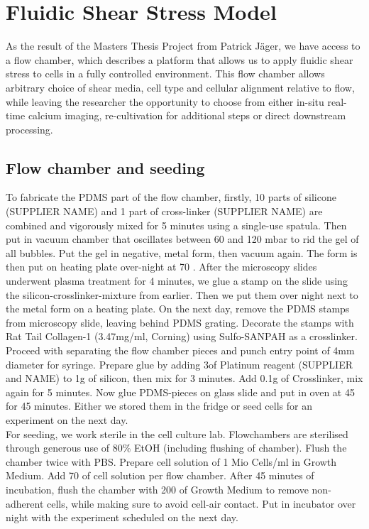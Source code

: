\section{Fluidic Shear Stress Model}
As the result of the Masters Thesis Project from Patrick Jäger, we have access to a flow chamber, which describes a platform that allows us to apply fluidic shear stress to cells in a fully controlled environment. This flow chamber allows arbitrary choice of shear media, cell type and cellular alignment relative to flow, while leaving the researcher the opportunity to choose from either in-situ real-time calcium imaging, re-cultivation for additional steps or direct downstream processing.

\subsection{Flow chamber and seeding}
\label{sec:FluidicModel}
To fabricate the PDMS part of the flow chamber, firstly, 10 parts of silicone (SUPPLIER NAME) and 1 part of cross-linker (SUPPLIER NAME) are combined and vigorously mixed for 5 minutes using a single-use spatula. Then put in vacuum chamber that oscillates between 60 and 120 mbar to rid the gel of all bubbles. Put the gel in negative, metal form, then vacuum again. The form is then put on heating plate over-night at 70 \degC{}. After the microscopy slides underwent plasma treatment for 4 minutes, we glue a stamp on the slide using the silicon-crosslinker-mixture from earlier. Then we put them over night next to the metal form on a heating plate. On the next day, remove the PDMS stamps from microscopy slide, leaving behind PDMS grating. Decorate the stamps with Rat Tail Collagen-1 (3.47mg/ml, Corning) using Sulfo-SANPAH as a crosslinker. Proceed with separating the flow chamber pieces and punch entry point of 4mm diameter for syringe. Prepare glue by adding 3\mul of Platinum reagent (SUPPLIER and NAME) to 1g of silicon, then mix for 3 minutes. Add 0.1g of Crosslinker, mix again for 5 minutes. Now glue PDMS-pieces on glass slide and put in oven at 45 \degC{} for 45 minutes. Either we stored them in the fridge or seed cells for an experiment on the next day.\\
For seeding, we work sterile in the cell culture lab. Flowchambers are sterilised through generous use of 80\% EtOH (including flushing of chamber). Flush the chamber twice with PBS. Prepare cell solution of 1 Mio Cells/ml in Growth Medium. Add 70 \mul{} of cell solution per flow chamber. After 45 minutes of incubation, flush the chamber with 200\mul{} of Growth Medium to remove non-adherent cells, while making sure to avoid cell-air contact. Put in incubator over night with the experiment scheduled on the next day.

